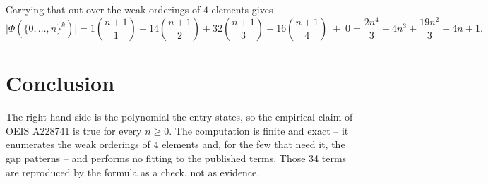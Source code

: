 \documentclass[11pt,a4paper]{article}
\theoremstyle{plain}
\theoremstyle{definition}
\begin{document}
Carrying that out over the weak orderings of $4$ elements gives
\[
  \lvert\Phi(\{0,\dots,n\}^k)\rvert
  = 1\binom{n+1}{1} + 14\binom{n+1}{2} + 32\binom{n+1}{3} + 16\binom{n+1}{4} \;+\; 0
  = \frac{2 n^{4}}{3} + 4 n^{3} + \frac{19 n^{2}}{3} + 4 n + 1 .
\]

\section{Conclusion}

The right-hand side is the polynomial the entry states, so the empirical claim of OEIS A228741 is
true for every $n\ge 0$. The computation is finite and exact -- it enumerates the weak orderings
of $4$ elements and, for the few that need it, the gap patterns -- and performs no fitting to
the published terms. Those 34 terms are reproduced by the formula as a check, not as
evidence.
\end{document}
